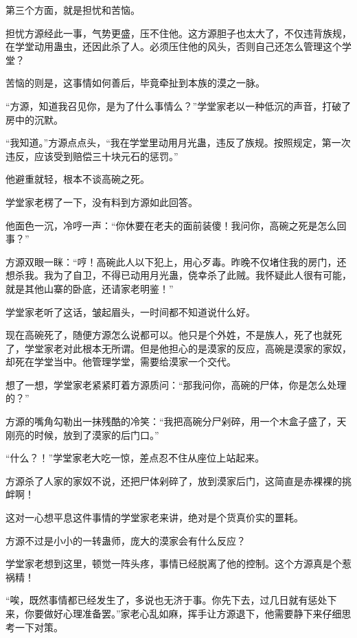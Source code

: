 \begin{this_body}
第三个方面，就是担忧和苦恼。

担忧方源经此一事，气势更盛，压不住他。这方源胆子也太大了，不仅违背族规，在学堂动用蛊虫，还因此杀了人。必须压住他的风头，否则自己还怎么管理这个学堂？

苦恼的则是，这事情如何善后，毕竟牵扯到本族的漠之一脉。

“方源，知道我召见你，是为了什么事情么？”学堂家老以一种低沉的声音，打破了房中的沉默。

“我知道。”方源点点头，“我在学堂里动用月光蛊，违反了族规。按照规定，第一次违反，应该受到赔偿三十块元石的惩罚。”

他避重就轻，根本不谈高碗之死。

学堂家老楞了一下，没有料到方源如此回答。

他面色一沉，冷哼一声：“你休要在老夫的面前装傻！我问你，高碗之死是怎么回事？”

方源双眼一眯：“哼！高碗此人以下犯上，用心歹毒。昨晚不仅堵住我的房门，还想杀我。我为了自卫，不得已动用月光蛊，侥幸杀了此贼。我怀疑此人很有可能，就是其他山寨的卧底，还请家老明鉴！”

学堂家老听了这话，皱起眉头，一时间都不知道说什么好。

现在高碗死了，随便方源怎么说都可以。他只是个外姓，不是族人，死了也就死了，学堂家老对此根本无所谓。但是他担心的是漠家的反应，高碗是漠家的家奴，却死在学堂当中。他管理学堂，需要给漠家一个交代。

想了一想，学堂家老紧紧盯着方源质问：“那我问你，高碗的尸体，你是怎么处理的？”

方源的嘴角勾勒出一抹残酷的冷笑：“我把高碗分尸剁碎，用一个木盒子盛了，天刚亮的时候，放到了漠家的后门口。”

“什么？！”学堂家老大吃一惊，差点忍不住从座位上站起来。

方源杀了人家的家奴不说，还把尸体剁碎了，放到漠家后门，这简直是赤裸裸的挑衅啊！

这对一心想平息这件事情的学堂家老来讲，绝对是个货真价实的噩耗。

方源不过是小小的一转蛊师，庞大的漠家会有什么反应？

学堂家老想到这里，顿觉一阵头疼，事情已经脱离了他的控制。这个方源真是个惹祸精！

“唉，既然事情都已经发生了，多说也无济于事。你先下去，过几日就有惩处下来，你要做好心理准备罢。”家老心乱如麻，挥手让方源退下，他需要静下来仔细思考一下对策。

\end{this_body}

